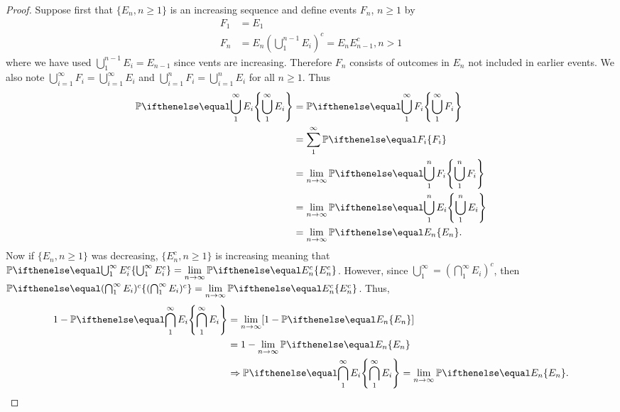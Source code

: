 \documentclass[a4paper,8pt]{article}
\begin{document}
\begin{outline}
    \begin{proof}
      Suppose first that \(\{E_n, n \geq 1\}\) is an increasing sequence and define events \(F_n\), \(n \geq 1\) by
      \begin{align*}
        F_1 &= E_1\\
        F_n &= E_n(\bigcup_{1}^{n-1}E_i)^c = E_nE_{n-1}^c, n > 1
      \end{align*}
      where we have used \(\bigcup_{1}^{n-1}E_i = E_{n-1}\) since vents are increasing. Therefore \(F_n\) consists
      of outcomes in \(E_n\) not included in earlier events. We also note \(\bigcup_{i=1}^{\infty} F_i =
      \bigcup_{i=1}^{\infty} E_i\) and \(\bigcup_{i=1}^{n} F_i = \bigcup_{i=1}^{n} E_i\) for all \(n \geq 1\). Thus
      \begin{align*}
        \bbp[\bigcup_{1}^{\infty} E_i] &= \bbp[\bigcup_{1}^{\infty} F_i]\\
                                             &= \sum_{1}^{\infty} \bbp[F_i]\\
                                             &= \lim_{n\rightarrow\infty} \bbp[\bigcup_{1}^n F_i]\\
                                             &= \lim_{n\rightarrow\infty} \bbp[\bigcup_{1}^n E_i]\\
                                             &= \lim_{n\rightarrow\infty} \bbp[E_n]\text{.}
      \end{align*}
      Now if \(\{E_n, n \geq 1\}\) was decreasing, \(\{E_n^c, n \geq 1\}\) is increasing meaning that
      \(\bbp[\bigcup_{1}^{\infty} E_i^c] = \lim\limits_{n\rightarrow\infty} \bbp[E_n^c]\).
      However, since \(\bigcup_{1}^{\infty} = (\bigcap_{1}^{\infty}E_i)^c\), then
      \(\bbp[(\bigcap_{1}^{\infty}E_i)^c] = \lim\limits_{n\rightarrow\infty} \bbp[E_n^c]\). Thus,
      \begin{align*}
        1 - \bbp[\bigcap_{1}^{\infty} E_i] &= \lim_{n\rightarrow\infty} [1-\bbp[E_n]] \\
                                           &= 1 - \lim_{n\rightarrow\infty} \bbp[E_n] \\
                                           &\Rightarrow \bbp[\bigcap_{1}^{\infty} E_i]
                                           = \lim_{n\rightarrow\infty}\bbp[E_n]\text{.}
      \end{align*}
    \end{proof}

\end{outline}
\end{document}
